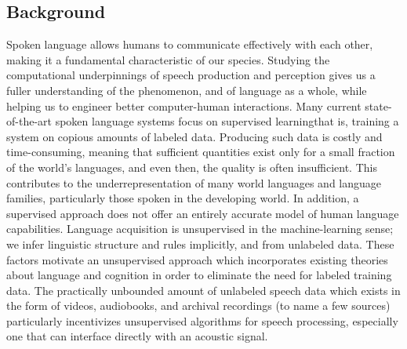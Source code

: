 \documentclass[12pt,letterpaper]{article}
\begin{document}
\subsection{Background}
Spoken language allows humans to communicate effectively with each other, making it a fundamental characteristic of our species. Studying the computational underpinnings of speech production and perception gives us a fuller understanding of the phenomenon, and of language as a whole, while helping us to engineer better computer-human interactions. Many current state-of-the-art spoken language systems focus on supervised learning\textemdash that is, training a system on copious amounts of labeled data. Producing such data is costly and time-consuming, meaning that sufficient quantities exist only for a small fraction of the world's languages, and even then, the quality is often insufficient. This contributes to the underrepresentation of many world languages and language families, particularly those spoken in the developing world. In addition, a supervised approach does not offer an entirely accurate model of human language capabilities. Language acquisition is unsupervised in the machine-learning sense; we infer linguistic structure and rules implicitly, and from unlabeled data. These factors motivate an unsupervised approach which incorporates existing theories about language and cognition in order to eliminate the need for labeled training data. The practically unbounded amount of unlabeled speech data which exists in the form of videos, audiobooks, and archival recordings (to name a few sources) particularly incentivizes unsupervised algorithms for speech processing, especially one that can interface directly with an acoustic signal.  
\end{document}
